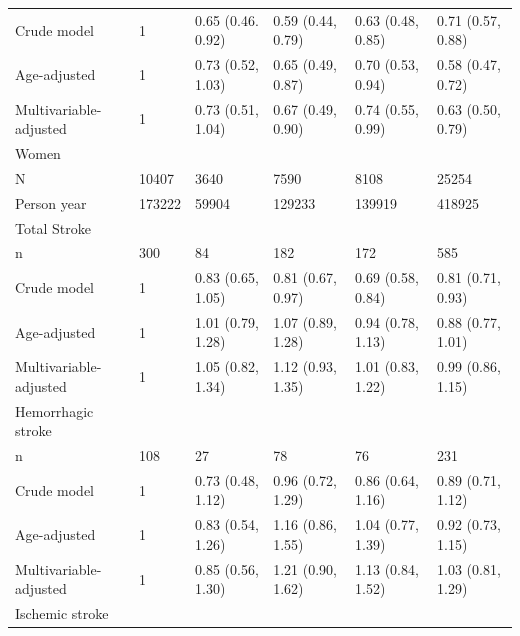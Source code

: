 \documentclass[]{tufte-handout}
\begin{document}
\begin{table}[!h]
\begin{tabular}[t]{llllll}
\hspace{1em}Crude model & 1 & 0.65 (0.46. 0.92) & 0.59 (0.44, 0.79) & 0.63 (0.48, 0.85) & 0.71 (0.57, 0.88)\\
\rowcolor{gray!6}  \hspace{1em}Age-adjusted & 1 & 0.73 (0.52, 1.03) & 0.65 (0.49, 0.87) & 0.70 (0.53, 0.94) & 0.58 (0.47, 0.72)\\
\hspace{1em}Multivariable-adjusted & 1 & 0.73 (0.51, 1.04) & 0.67 (0.49, 0.90) & 0.74 (0.55, 0.99) & 0.63 (0.50, 0.79)\\
\rowcolor{gray!6}  Women &  &  &  &  & \\
N & 10407 & 3640 & 7590 & 8108 & 25254\\
\rowcolor{gray!6}  Person year & 173222 & 59904 & 129233 & 139919 & 418925\\
Total Stroke &  &  &  &  & \\
\rowcolor{gray!6}  \hspace{1em}n & 300 & 84 & 182 & 172 & 585\\
\hspace{1em}Crude model & 1 & 0.83 (0.65, 1.05) & 0.81 (0.67, 0.97) & 0.69 (0.58, 0.84) & 0.81 (0.71, 0.93)\\
\rowcolor{gray!6}  \hspace{1em}Age-adjusted & 1 & 1.01 (0.79, 1.28) & 1.07 (0.89, 1.28) & 0.94 (0.78, 1.13) & 0.88 (0.77, 1.01)\\
\hspace{1em}Multivariable-adjusted & 1 & 1.05 (0.82, 1.34) & 1.12 (0.93, 1.35) & 1.01 (0.83, 1.22) & 0.99 (0.86, 1.15)\\
\rowcolor{gray!6}  Hemorrhagic stroke &  &  &  &  & \\
\hspace{1em}n & 108 & 27 & 78 & 76 & 231\\
\rowcolor{gray!6}  \hspace{1em}Crude model & 1 & 0.73 (0.48, 1.12) & 0.96 (0.72, 1.29) & 0.86 (0.64, 1.16) & 0.89 (0.71, 1.12)\\
\hspace{1em}Age-adjusted & 1 & 0.83 (0.54, 1.26) & 1.16 (0.86, 1.55) & 1.04 (0.77, 1.39) & 0.92 (0.73, 1.15)\\
\rowcolor{gray!6}  \hspace{1em}Multivariable-adjusted & 1 & 0.85 (0.56, 1.30) & 1.21 (0.90, 1.62) & 1.13 (0.84, 1.52) & 1.03 (0.81, 1.29)\\
Ischemic stroke &  &  &  &  & \\

\end{tabular}
\end{table}
\end{document}
